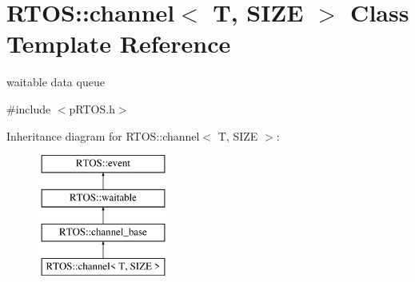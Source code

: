 \hypertarget{class_r_t_o_s_1_1channel}{}\section{R\+T\+OS\+:\+:channel$<$ T, S\+I\+ZE $>$ Class Template Reference}
\label{class_r_t_o_s_1_1channel}


waitable data queue  




{\ttfamily \#include $<$p\+R\+T\+O\+S.\+h$>$}

Inheritance diagram for R\+T\+OS\+:\+:channel$<$ T, S\+I\+ZE $>$\+:\begin{figure}[H]
\begin{center}
\leavevmode
\includegraphics[height=4.000000cm]{class_r_t_o_s_1_1channel}
\end{center}
\end{figure}
